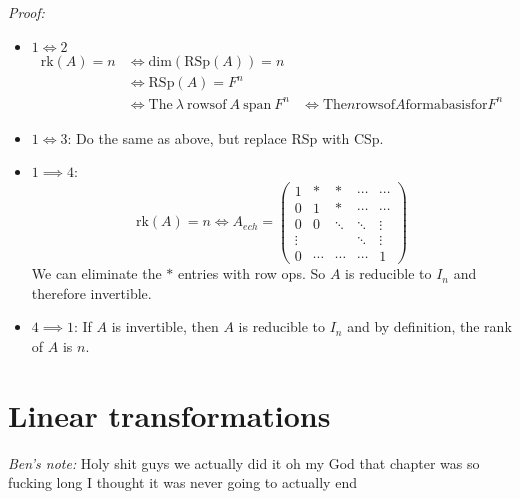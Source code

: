 \documentclass{report}
\theoremstyle{remark}
\theoremstyle{definition}
\theoremstyle{definition}
\theoremstyle{theorem}
\begin{document}
\emph{Proof:}
\begin{itemize}
    \item $1 \iff 2$
    \begin{align*}
        \mathrm{rk}(A) = n &\iff \mathrm{dim}(\mathrm{RSp}(A)) = n\\
        &\iff \mathrm{RSp}(A) = F^n\\
        &\iff \mathrm{The} \> \lambda \> \mathrm{rows of} \>A \> \mathrm{span}\> F^n
        &\iff \mathrm{The} n \mathrm{rows of} A \mathrm{form a basis for} F^n
    \end{align*}
    \item $1 \iff 3$: Do the same as above, but replace RSp with CSp.
    \item$ 1 \implies 4$:
    \[\mathrm{rk}(A)=n \iff A_{ech} = \begin{pmatrix}
    1&*&*&\cdots&\cdots\\
    0&1&*&\cdots&\cdots\\
    0&0&\ddots&\ddots&\vdots\\
    \vdots&&&\ddots&\vdots\\
    0&\cdots&\cdots&\cdots&1
    \end{pmatrix}\]
    We can eliminate the $*$ entries with row ops. So $A$ is reducible to $I_n$ and therefore invertible.
    \item $4 \implies 1$: If $A$ is invertible, then $A$ is reducible to $I_n$ and by definition, the rank of $A$ is $n$.
\end{itemize}
\section{Linear transformations}
\emph{Ben's note:} Holy shit guys we actually did it oh my God that chapter was so fucking long I thought it was never going to actually end\par
\end{document}
